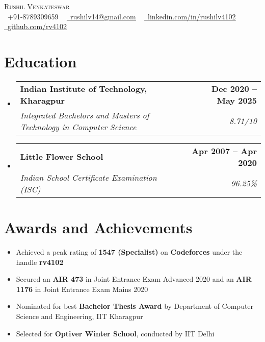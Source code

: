 \documentclass[letterpaper]{article}
\makeatletter
\newcommand{\resumeItem}[1]{
  \item\small{
    {#1 \vspace{-2pt}}
  }
}
\newcommand{\resumeSubheading}[4]{
  \vspace{-2pt}\item
    \begin{tabular*}{1.0\textwidth}[t]{l@{\extracolsep{\fill}}r}
      \textbf{#1} & \textbf{\small #2} \\
      \textit{\small#3} & \textit{\small #4} \\
    \end{tabular*}\vspace{-7pt}
}
\newcommand{\resumeSubHeadingListStart}{\begin{itemize}[leftmargin=0.0in, label={}]}
\newcommand{\resumeSubHeadingListEnd}{\end{itemize}}
\newcommand{\resumeItemListStart}{\begin{itemize}}
\newcommand{\resumeItemListEnd}{\end{itemize}\vspace{-5pt}}
\makeatother
\begin{document}

\begin{center}
    {\Huge \scshape Rushil Venkateswar} \\ \vspace{1.5pt}
    \small \raisebox{-0.1\height}\faPhone\ +91-8789309659 ~ \href{mailto:x=rushilv14@gmail.com}{\raisebox{-0.2\height}\faEnvelope\  \underline{rushilv14@gmail.com}} ~ 
    \href{https://www.linkedin.com/in/rushilv4102/}{\raisebox{-0.2\height}\faLinkedin\ \underline{linkedin.com/in/rushilv4102}}  ~
    \href{https://github.com/rv4102}{\raisebox{-0.2\height}\faGithub\ \underline{github.com/rv4102}}
\end{center}
\vspace{-12pt}


\section{Education}
  \resumeSubHeadingListStart
    \resumeSubheading
      {Indian Institute of Technology, Kharagpur}
      {Dec 2020 -- May 2025}
      {Integrated Bachelors and Masters of Technology in Computer Science}{8.71/10}
    
    \resumeSubheading
      {Little Flower School}
      {Apr 2007 -- Apr 2020}
      {Indian School Certificate Examination (ISC)}
      {96.25\%}
  \resumeSubHeadingListEnd
\vspace{-8pt}

\section{Awards and Achievements}
    \resumeItemListStart
    \itemsep0em 
        \resumeItem{Achieved a peak rating of \textbf{1547 (Specialist)} on \textbf{Codeforces} under the handle \textbf{rv4102}}
        \resumeItem{Secured an \textbf{AIR 473} in Joint Entrance Exam Advanced 2020 and an \textbf{AIR 1176} in Joint Entrance Exam Mains 2020}
        \resumeItem{Nominated for best \textbf{Bachelor Thesis Award} by Department of Computer Science and Engineering, IIT Kharagpur}
        \resumeItem{Selected for \textbf{Optiver Winter School}, conducted by IIT Delhi}
    \resumeItemListEnd
\vspace{-10pt}
  
\end{document}
